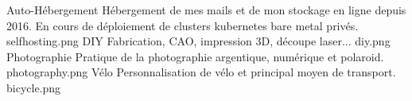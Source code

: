 \interest%
{Auto-Hébergement}%
{Hébergement de mes mails et de mon stockage en ligne depuis 2016. En cours de
déploiement de clusters kubernetes bare metal privés.}%
{selfhosting.png}%
\interest%
{DIY}%
{Fabrication, CAO, impression 3D, découpe laser...}%
{diy.png}%
\interest%
{Photographie}%
{Pratique de la photographie argentique, numérique et polaroid.}%
{photography.png}%
\interest%
{Vélo}%
{Personnalisation de vélo et principal moyen de transport.}%
{bicycle.png}%
